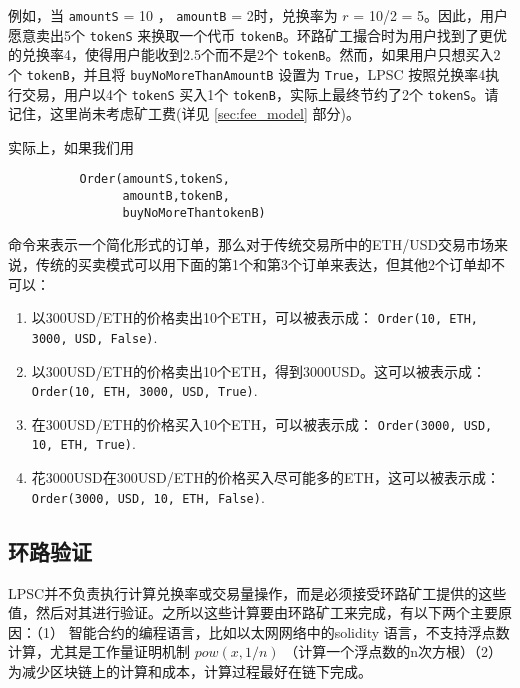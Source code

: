 \documentclass[UTF8]{ctexart}
\begin{document}
\begin{multicols}{2}
例如，当 \verb|amountS| = 10 ， \verb|amountB| = 2时，兑换率为 $r$ = 10/2 = 5。因此，用户愿意卖出5个 \verb|tokenS| 来换取一个代币 \verb|tokenB|。环路矿工撮合时为用户找到了更优的兑换率4，使得用户能收到2.5个而不是2个 \verb|tokenB|。然而，如果用户只想买入2个 \verb|tokenB|，并且将 \verb|buyNoMoreThanAmountB| 设置为 \verb|True|，LPSC 按照兑换率4执行交易，用户以4个 \verb|tokenS| 买入1个 \verb|tokenB|，实际上最终节约了2个 \verb|tokenS|。请记住，这里尚未考虑矿工费(详见 \ref{sec:fee_model} 部分)。

实际上，如果我们用


\begin{verbatim}
	      Order(amountS,tokenS,
	            amountB,tokenB,
	            buyNoMoreThantokenB)
\end{verbatim}

命令来表示一个简化形式的订单，那么对于传统交易所中的ETH/USD交易市场来说，传统的买卖模式可以用下面的第1个和第3个订单来表达，但其他2个订单却不可以：

\begin{enumerate}
	\item 以300USD/ETH的价格卖出10个ETH，可以被表示成： \verb|Order(10, ETH, 3000, USD, False)|.
	\item 以300USD/ETH的价格卖出10个ETH，得到3000USD。这可以被表示成： \verb|Order(10, ETH, 3000, USD, True)|.
	\item 在300USD/ETH的价格买入10个ETH，可以被表示成： \verb|Order(3000, USD, 10, ETH, True)|.
	\item 花3000USD在300USD/ETH的价格买入尽可能多的ETH，这可以被表示成： \verb|Order(3000, USD, 10, ETH, False)|.
\end{enumerate}



\subsection{环路验证\label{sec:ring_verification}}

LPSC并不负责执行计算兑换率或交易量操作，而是必须接受环路矿工提供的这些值，然后对其进行验证。之所以这些计算要由环路矿工来完成，有以下两个主要原因：（1） 智能合约的编程语言，比如以太网网络中的solidity\cite{dannen2017introducing} 语言，不支持浮点数计算，尤其是工作量证明机制 $pow(x, 1/n)$ （计算一个浮点数的n次方根）（2） 为减少区块链上的计算和成本，计算过程最好在链下完成。



\end{multicols}
\end{document}
